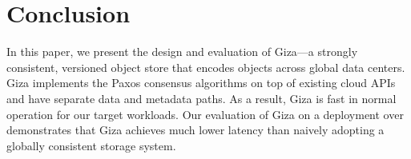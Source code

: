 \section{Conclusion}

In this paper, we present the design and evaluation of Giza---a strongly
consistent, versioned object store that encodes objects across global data
centers. Giza implements the Paxos consensus algorithms on top of existing cloud
APIs and have separate data and metadata paths. As a result, Giza is fast in
normal operation for our target workloads. Our evaluation of Giza on a
deployment over \deployment demonstrates that Giza achieves much lower latency
than naively adopting a globally consistent storage system.


